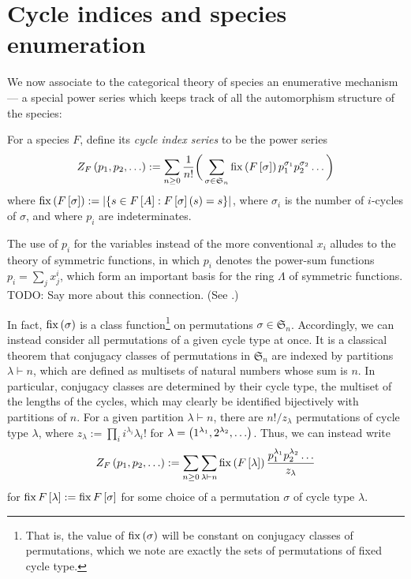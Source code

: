 \documentclass[sectionflow,singlespace,twoside]{brandiss} %
\numberwithin{section}{chapter}
\numberwithin{figure}{chapter}
\begin{document}
\section{Cycle indices and species enumeration}\label{s:cycind}
We now associate to the categorical theory of species an enumerative mechanism --- a special power series which keeps track of all the automorphism structure of the species:
\begin{definition}
  \label{def:cycind}
  For a species $F$, define its \emph{cycle index series} to be the power series
  \begin{equation}
    \label{eq:cycinddef}
    Z_{F} \left( {p_{1}, p_{2}, \dots} \right) := \sum_{n \geq 0} \frac{1}{n!} \bigg( \sum_{\sigma \in \mathfrak{S}_{n}} \operatorname{fix} \left( {F \left[ {\sigma} \right]} \right) p_{1}^{\sigma_{1}} p_{2}^{\sigma_{2}} \dots \bigg)
  \end{equation}
  where $\operatorname{fix} \left( {F \left[ {\sigma} \right]} \right) := \left\vert {\ensuremath{\left\{ {s \in F \left[ {A} \right] : F \left[ {\sigma} \right] \left( {s} \right) = s} \right\}}} \right\vert$, where $\sigma_{i}$ is the number of $i$-cycles of $\sigma$, and where $p_{i}$ are indeterminates.
\end{definition}

The use of $p_{i}$ for the variables instead of the more conventional $x_{i}$ alludes to the theory of symmetric functions, in which $p_{i}$ denotes the power-sum functions $p_{i} = \sum_{j} x_{j}^{i}$, which form an important basis for the ring $\Lambda$ of symmetric functions.
TODO: Say more about this connection. (See \cite{gessel:laginvspec}.)

In fact, $\operatorname{fix} \left( {\sigma} \right)$ is a class function\footnote{That is, the value of $\operatorname{fix} \left( {\sigma} \right)$ will be constant on conjugacy classes of permutations, which we note are exactly the sets of permutations of fixed cycle type.} on permutations $\sigma \in \mathfrak{S}_{n}$.
Accordingly, we can instead consider all permutations of a given cycle type at once.
It is a classical theorem that conjugacy classes of permutations in $\mathfrak{S}_{n}$ are indexed by partitions $\lambda \vdash n$, which are defined as multisets of natural numbers whose sum is $n$.
In particular, conjugacy classes are determined by their cycle type, the multiset of the lengths of the cycles, which may clearly be identified bijectively with partitions of $n$.
For a given partition $\lambda \vdash n$, there are $n! / z_{\lambda}$ permutations of cycle type $\lambda$, where $z_{\lambda} := \prod_{i} i^{\lambda_{i}} \lambda_{i}!$ for $\lambda = \left( {1^{\lambda_{1}}, 2^{\lambda_{2}}, \dots} \right)$.
Thus, we can instead write
\begin{equation}
  \label{eq:cycinddefpart}
  Z_{F} \left( {p_{1}, p_{2}, \dots} \right) := \sum_{n \geq 0} \sum_{\lambda \vdash n} \operatorname{fix} \left( {F \left[ {\lambda} \right]} \right) \frac{p_{1}^{\lambda_{1}} p_{2}^{\lambda_{2}} \dots}{z_{\lambda}}
\end{equation}
for $\operatorname{fix} F \left[ {\lambda} \right] := \operatorname{fix} F \left[ {\sigma} \right]$ for some choice of a permutation $\sigma$ of cycle type $\lambda$.
\end{document}
